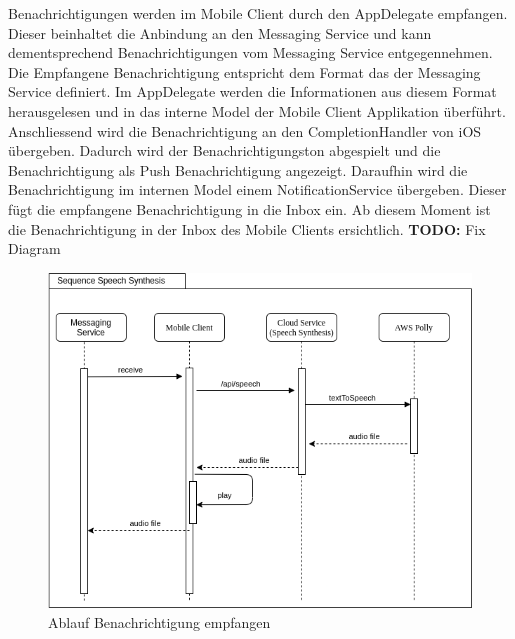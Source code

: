 Benachrichtigungen werden im Mobile Client durch den AppDelegate empfangen.
Dieser beinhaltet die Anbindung an den Messaging Service und kann dementsprechend Benachrichtigungen vom Messaging Service entgegennehmen.
Die Empfangene Benachrichtigung entspricht dem Format das der Messaging Service definiert.
Im AppDelegate werden die Informationen aus diesem Format herausgelesen und in das interne Model der Mobile Client Applikation überführt.
Anschliessend wird die Benachrichtigung an den CompletionHandler von iOS übergeben.
Dadurch wird der Benachrichtigungston abgespielt und die Benachrichtigung als Push Benachrichtigung angezeigt.
Daraufhin wird die Benachrichtigung im internen Model einem NotificationService übergeben.
Dieser fügt die empfangene Benachrichtigung in die Inbox ein.
Ab diesem Moment ist die Benachrichtigung in der Inbox des Mobile Clients ersichtlich.
\textbf{TODO: } Fix Diagram

\begin{figure}[h]
    \centering
    \begin{minipage}[b]{0.9\textwidth}
        \includegraphics[width=\textwidth]{graphics/diagramms/Sequence_Speech_Synth_V01}
        \caption{Ablauf Benachrichtigung empfangen}
    \end{minipage}
\end{figure}


